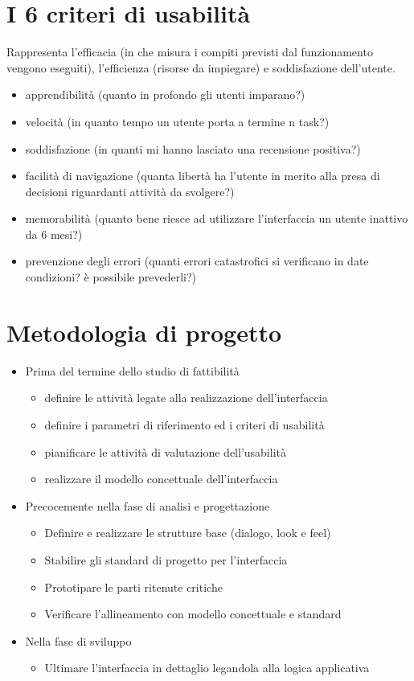 \documentclass[a4paper,12pt]{report}
\begin{document}
	\section{I 6 criteri di usabilità}
	Rappresenta l'efficacia (in che misura i compiti previsti dal funzionamento vengono eseguiti), l'efficienza (risorse da impiegare) e soddisfazione dell'utente.
	\begin{itemize}
		\item apprendibilità (quanto in profondo gli utenti imparano?)
		\item velocità (in quanto tempo un utente porta a termine n task?)
		\item soddisfazione (in quanti mi hanno lasciato una recensione positiva?)
		\item facilità di navigazione (quanta libertà ha l'utente in merito alla presa di decisioni riguardanti attività da svolgere?)
		\item memorabilità (quanto bene riesce ad utilizzare l'interfaccia un utente inattivo da 6 mesi?)
		\item prevenzione degli errori (quanti errori catastrofici si verificano in date condizioni? è possibile prevederli?)
	\end{itemize}
	\section{Metodologia di progetto}
	\begin{itemize}
		\item Prima del termine dello studio di fattibilità
		\begin{itemize}
			\item definire le attività legate alla realizzazione dell’interfaccia
			\item definire i parametri di riferimento ed i criteri di usabilità
			\item pianificare le attività di valutazione dell’usabilità
			\item realizzare il modello concettuale dell’interfaccia
		\end{itemize}
		\item Precocemente nella fase di analisi e progettazione
		\begin{itemize}
			\item Definire e realizzare le strutture base (dialogo, look e feel)
			\item Stabilire gli standard di progetto per l’interfaccia
			\item Prototipare le parti ritenute critiche
			\item Verificare l’allineamento con modello concettuale e standard
		\end{itemize}
		\item Nella fase di sviluppo
		\begin{itemize}
			\item Ultimare l’interfaccia in dettaglio legandola alla logica applicativa
		\end{itemize}
	\end{itemize}
\end{document}
